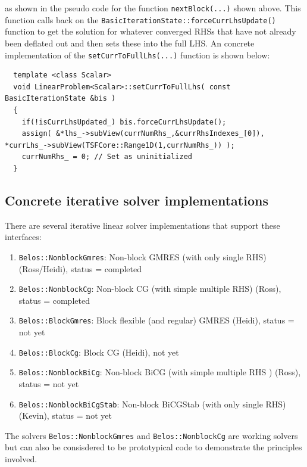 \documentclass[pdf,ps2pdf,11pt]{SANDreport}
\begin{document}
\begin{enumerate}
{}\noindent{}as shown in the pseudo code for the function
{}\texttt{nextBlock(...)} shown above.  This function calls back on
the {}\texttt{Basic\-Iteration\-State\-::force\-Curr\-Lhs\-Update()}
function to get the solution for whatever converged RHSs that have not
already been deflated out and then sets these into the full LHS.  An
concrete implementation of the
{}\texttt{set\-Curr\-To\-Full\-Lhs(...)} function is shown below:

{\scriptsize\begin{verbatim}
  template <class Scalar>
  void LinearProblem<Scalar>::setCurrToFullLhs( const BasicIterationState &bis )
  {
    if(!isCurrLhsUpdated_) bis.forceCurrLhsUpdate();
    assign( &*lhs_->subView(currNumRhs_,&currRhsIndexes_[0]), *currLhs_->subView(TSFCore::Range1D(1,currNumRhs_)) );
    currNumRhs_ = 0; // Set as uninitialized
  }
\end{verbatim}}

\end{enumerate}

\subsection{Concrete iterative solver implementations}

There are several iterative linear solver implementations that support
these interfaces:

\begin{enumerate}
\item {}\texttt{Belos::NonblockGmres}: Non-block GMRES (with only single RHS) (Ross/Heidi), status = completed
\item {}\texttt{Belos::NonblockCg}: Non-block CG (with simple multiple RHS) (Ross), status = completed
\item {}\texttt{Belos::BlockGmres}: Block flexible (and regular) GMRES (Heidi), status = not yet
\item {}\texttt{Belos::BlockCg}: Block CG (Heidi), not yet
\item {}\texttt{Belos::NonblockBiCg}: Non-block BiCG (with simple multiple RHS ) (Ross), status = not yet
\item {}\texttt{Belos::NonblockBiCgStab}: Non-block BiCGStab (with only single RHS) (Kevin), status = not yet
\end{enumerate}

The solvers {}\texttt{Belos::NonblockGmres} and
{}\texttt{Belos::NonblockCg} are working solvers but can also be
consisdered to be prototypical code to demonstrate the principles
involved.
\end{document}
